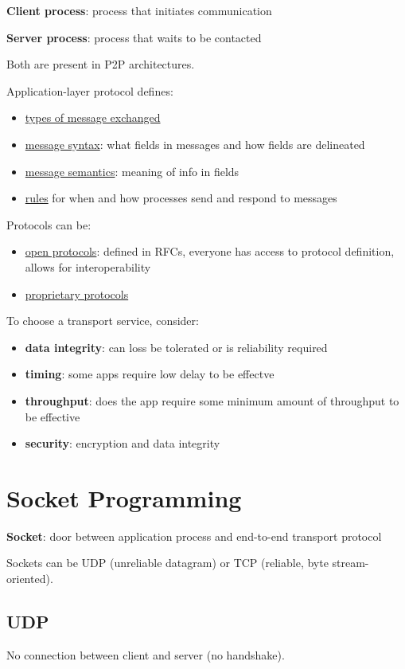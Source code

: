 \documentclass[11pt]{article}
\begin{document}
\textbf{Client process}: process that initiates communication

\textbf{Server process}: process that waits to be contacted

Both are present in P2P architectures.

Application-layer protocol defines:
\begin{itemize}
\item \uline{types of message exchanged}
\item \uline{message syntax}: what fields in messages and how fields are delineated
\item \uline{message semantics}: meaning of info in fields
\item \uline{rules} for when and how processes send and respond to messages
\end{itemize}

Protocols can be:
\begin{itemize}
\item \uline{open protocols}: defined in RFCs, everyone has access to protocol definition, allows for interoperability
\item \uline{proprietary protocols}
\end{itemize}

To choose a transport service, consider:
\begin{itemize}
\item \textbf{data integrity}: can loss be tolerated or is reliability required
\item \textbf{timing}: some apps require low delay to be effectve
\item \textbf{throughput}: does the app require some minimum amount of throughput to be effective
\item \textbf{security}: encryption and data integrity
\end{itemize}
\section{Socket Programming}
\label{sec:orgb1cd792}
\textbf{Socket}: door between application process and end-to-end transport protocol

Sockets can be UDP (unreliable datagram) or TCP (reliable, byte stream-oriented).
\subsection{UDP}
\label{sec:org45c688d}
No connection between client and server (no handshake).
\end{document}
